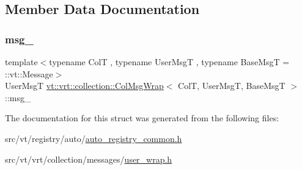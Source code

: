\subsection{Member Data Documentation}
\mbox{\label{structvt_1_1vrt_1_1collection_1_1_col_msg_wrap_a781048274a322da08bc83a90adc8d37e}} 
\subsubsection{\texorpdfstring{msg\+\_\+}{msg\_}}
{\footnotesize\ttfamily template$<$typename ColT , typename User\+MsgT , typename Base\+MsgT  = \+::vt\+::\+Message$>$ \\
User\+MsgT \hyperlink{structvt_1_1vrt_1_1collection_1_1_col_msg_wrap}{vt\+::vrt\+::collection\+::\+Col\+Msg\+Wrap}$<$ ColT, User\+MsgT, Base\+MsgT $>$\+::msg\+\_\+\hspace{0.3cm}{\ttfamily [private]}}



The documentation for this struct was generated from the following files\+:\begin{DoxyCompactItemize}
\item 
src/vt/registry/auto/\hyperlink{auto__registry__common_8h}{auto\+\_\+registry\+\_\+common.\+h}\item 
src/vt/vrt/collection/messages/\hyperlink{user__wrap_8h}{user\+\_\+wrap.\+h}\end{DoxyCompactItemize}
